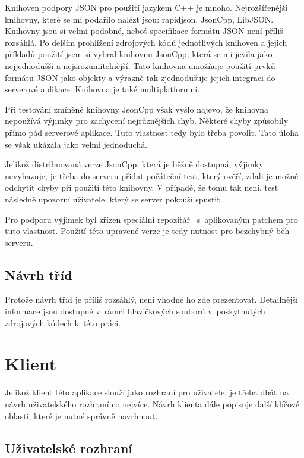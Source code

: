 \documentclass[thesis=B,czech]{FITthesis}[2013/10/20]
\begin{document}
Knihoven podpory JSON pro použití jazykem C++ je mnoho. Nejrozšířenější knihovny, které se mi podařilo nalézt jsou: rapidjson, JsonCpp, LibJSON. Knihovny jsou si velmi podobné, neboť specifikace formátu JSON není příliš rozsáhlá. Po delším prohlížení zdrojových kódů jednotlivých knihoven a jejich příkladů použití jsem si vybral knihovnu JsonCpp, která se mi jevila jako nejjednodušší a nejsrozumitelnější. Tato knihovna umožňuje použití prvků formátu JSON jako objekty a výrazně tak zjednodušuje jejich integraci do serverové aplikace. Knihovna je také multiplatformní.

Při testování zmíněné knihovny JsonCpp však vyšlo najevo, že knihovna nepoužívá výjimky pro zachycení nejrůznějších chyb. Některé chyby způsobily přímo pád serverové aplikace. Tuto vlastnost tedy bylo třeba povolit. Tato úloha se však ukázala jako velmi jednoduchá.

Jelikož distribuovaná verze JsonCpp, která je běžně dostupná, výjimky nevyhazuje, je třeba do serveru přidat počáteční test, který ověří, zdali je možné odchytit chyby při použití této knihovny. V případě, že tomu tak není, test následně upozorní uživatele, který se server pokouší spustit.

Pro podporu výjimek byl zřízen speciální repozitář~\cite{json_ex_repo} s~aplikovaným patchem pro tuto vlastnost. Použití této upravené verze je tedy nutnost pro bezchybný běh serveru.

\subsection{Návrh tříd}

Protože návrh tříd je příliš rozsáhlý, není vhodné ho zde prezentovat. Detailnější informace jsou dostupné v~rámci hlavičkových souborů v~poskytnutých zdrojových kódech k~této práci.

\section{Klient}

Jelikož klient této aplikace slouží jako rozhraní pro uživatele, je třeba dbát na návrh uživatelského rozhraní co nejvíce. Návrh klienta dále popisuje další klíčové oblasti, které je nutné správně navrhnout.

\subsection{Uživatelské rozhraní}
\end{document}
